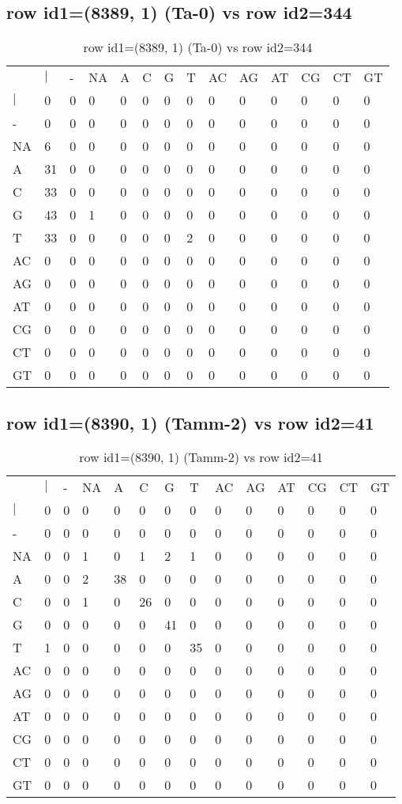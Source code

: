 \subsection{row id1=(8389, 1) (Ta-0) vs row id2=344}
\begin{center}
\begin{longtable}{|l|l|l|l|l|l|l|l|l|l|l|l|l|l|}
\caption{row id1=(8389, 1) (Ta-0) vs row id2=344} \label{table_dm634}\\
\hline
\\
\hline
&$|$&-&NA&A&C&G&T&AC&AG&AT&CG&CT&GT\\
$|$&0&0&0&0&0&0&0&0&0&0&0&0&0\\
-&0&0&0&0&0&0&0&0&0&0&0&0&0\\
NA&6&0&0&0&0&0&0&0&0&0&0&0&0\\
A&31&0&0&0&0&0&0&0&0&0&0&0&0\\
C&33&0&0&0&0&0&0&0&0&0&0&0&0\\
G&43&0&1&0&0&0&0&0&0&0&0&0&0\\
T&33&0&0&0&0&0&2&0&0&0&0&0&0\\
AC&0&0&0&0&0&0&0&0&0&0&0&0&0\\
AG&0&0&0&0&0&0&0&0&0&0&0&0&0\\
AT&0&0&0&0&0&0&0&0&0&0&0&0&0\\
CG&0&0&0&0&0&0&0&0&0&0&0&0&0\\
CT&0&0&0&0&0&0&0&0&0&0&0&0&0\\
GT&0&0&0&0&0&0&0&0&0&0&0&0&0\\
\hline
\end{longtable}
\end{center}

\subsection{row id1=(8390, 1) (Tamm-2) vs row id2=41}
\begin{center}
\begin{longtable}{|l|l|l|l|l|l|l|l|l|l|l|l|l|l|}
\caption{row id1=(8390, 1) (Tamm-2) vs row id2=41} \label{table_dm636}\\
\hline
\\
\hline
&$|$&-&NA&A&C&G&T&AC&AG&AT&CG&CT&GT\\
$|$&0&0&0&0&0&0&0&0&0&0&0&0&0\\
-&0&0&0&0&0&0&0&0&0&0&0&0&0\\
NA&0&0&1&0&1&2&1&0&0&0&0&0&0\\
A&0&0&2&38&0&0&0&0&0&0&0&0&0\\
C&0&0&1&0&26&0&0&0&0&0&0&0&0\\
G&0&0&0&0&0&41&0&0&0&0&0&0&0\\
T&1&0&0&0&0&0&35&0&0&0&0&0&0\\
AC&0&0&0&0&0&0&0&0&0&0&0&0&0\\
AG&0&0&0&0&0&0&0&0&0&0&0&0&0\\
AT&0&0&0&0&0&0&0&0&0&0&0&0&0\\
CG&0&0&0&0&0&0&0&0&0&0&0&0&0\\
CT&0&0&0&0&0&0&0&0&0&0&0&0&0\\
GT&0&0&0&0&0&0&0&0&0&0&0&0&0\\
\hline
\end{longtable}
\end{center}


